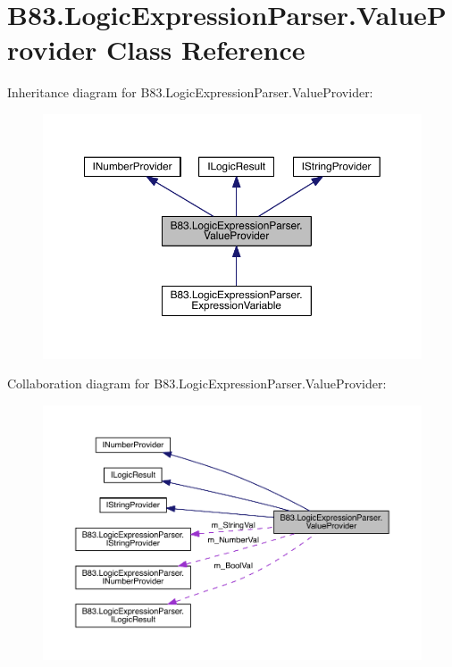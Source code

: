 \hypertarget{class_b83_1_1_logic_expression_parser_1_1_value_provider}{}\section{B83.\+Logic\+Expression\+Parser.\+Value\+Provider Class Reference}
\label{class_b83_1_1_logic_expression_parser_1_1_value_provider}


Inheritance diagram for B83.\+Logic\+Expression\+Parser.\+Value\+Provider\+:\nopagebreak
\begin{figure}[H]
\begin{center}
\leavevmode
\includegraphics[width=350pt]{class_b83_1_1_logic_expression_parser_1_1_value_provider__inherit__graph}
\end{center}
\end{figure}


Collaboration diagram for B83.\+Logic\+Expression\+Parser.\+Value\+Provider\+:\nopagebreak
\begin{figure}[H]
\begin{center}
\leavevmode
\includegraphics[width=350pt]{class_b83_1_1_logic_expression_parser_1_1_value_provider__coll__graph}
\end{center}
\end{figure}

